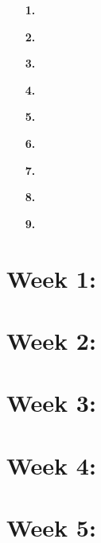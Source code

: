 \documentclass{article}
\title{\thistitle}
\author{\me}
\date{\today}
\begin{document}
\maketitle
\vspace{1em}
\begin{enumerate}
	\item[\large\textbf{1.}] \large\textbf{\titleone}
	\item[\large\textbf{2.}] \large\textbf{\titletwo}
	\item[\large\textbf{3.}] \large\textbf{\titlethree}
	\item[\large\textbf{4.}] \large\textbf{\titlefour}
	\item[\large\textbf{5.}] \large\textbf{\titlefive}
	\item[\large\textbf{6.}] \large\textbf{\titlesix}
	\item[\large\textbf{7.}] \large\textbf{\titleseven}
	\item[\large\textbf{8.}] \large\textbf{\titleeight}
	\item[\large\textbf{9.}] \large\textbf{\titlenine}
\end{enumerate}
\pagebreak

\centering
\section*{Week 1: \titleone}

\pagebreak

\centering
\section*{Week 2: \titletwo}

\pagebreak

\centering
\section*{Week 3: \titlethree}

\pagebreak

\centering
\section*{Week 4: \titlefour}

\pagebreak

\centering
\section*{Week 5: \titlefive}

\pagebreak
\end{document}
